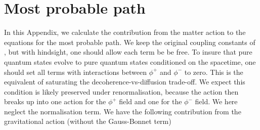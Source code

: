 \documentclass[aps,preprintnumbers,superscriptaddress,longbibliography]{revtex4-1}
\begin{document}

\section{Most probable path}
\label{app: mpp}

In this Appendix, we calculate the contribution from the matter action to the equations for the most probable path. We keep the original coupling constants of \cite{oppenheim2023covariant}, but with hindsight, one should allow each term be be free. To insure that pure quantum states evolve to pure quantum states conditioned on the spacetime, one should set all terms with interactions between $\phi^+$ and $\phi^-$ to zero. This is the equivalent of saturating the decoherence-vs-diffusion trade-off. We expect this condition is likely preserved under renormalisation, because the action then breaks up into one action for the $\phi^+$ field and one for the $\phi^-$ field.
We here neglect the normalisation term. We have the following contribution from the gravitational action (without the Gauss-Bonnet term)
\end{document}
